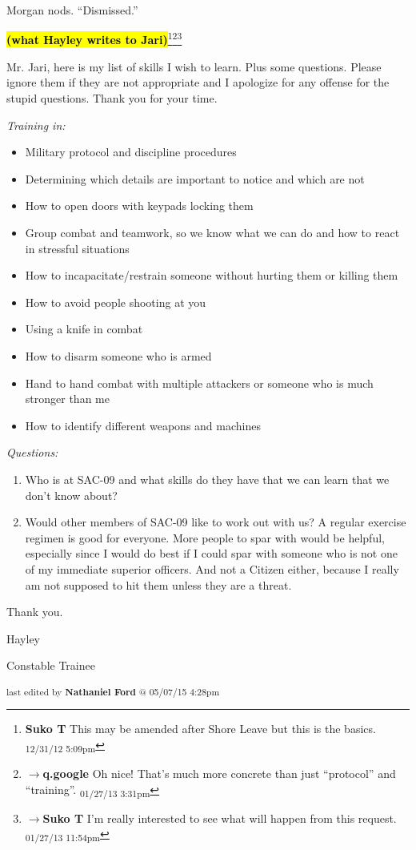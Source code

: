 Morgan nods. ``Dismissed.''


\textbf{\hl{(what Hayley writes to Jari)}}\footnote{\textbf{Suko T }This may be amended after Shore Leave but this is the basics. \textsubscript{12/31/12 5:09pm}}\footnote{$\rightarrow$\textbf{q.google }Oh nice!  That's much more concrete than just ``protocol'' and ``training''. \textsubscript{01/27/13 3:31pm}}\footnote{$\rightarrow$\textbf{Suko T }I'm really interested to see what will happen from this request. \textsubscript{01/27/13 11:54pm}}

Mr. Jari, here is my list of skills I wish to learn.  Plus some questions.  Please ignore them if they are not appropriate and I apologize for any offense for the stupid questions.  Thank you for your time.


\textit{Training in:}

{
\parskip=0pt
\begin{itemize}
\item Military protocol and discipline procedures
\item Determining which details are important to notice and which are not
\item How to open doors with keypads locking them
\item Group combat and teamwork, so we know what we can do and how to react in stressful situations
\item How to incapacitate/restrain someone without hurting them or killing them
\item How to avoid people shooting at you
\item Using a knife in combat
\item How to disarm someone who is armed
\item Hand to hand combat with multiple attackers or someone who is much stronger than me
\item How to identify different weapons and machines
\end{itemize}
}


\textit{Questions:}

\begin{enumerate}
\item Who is at SAC-09 and what skills do they have that we can learn that we don't know about?
\item Would other members of SAC-09 like to work out with us?  A regular exercise regimen is good for everyone.  More people to spar with would be helpful, especially since I would do best if I could spar with someone who is not one of my immediate superior officers.  And not a Citizen either, because I really am not supposed to hit them unless they are a threat. 
\end{enumerate}



Thank you.



Hayley

Constable Trainee


\vspace{\fill}

\begin{flushright}
\textsubscript{last edited by \textbf{Nathaniel Ford} @ 05/07/15 4:28pm}
\end{flushright}

